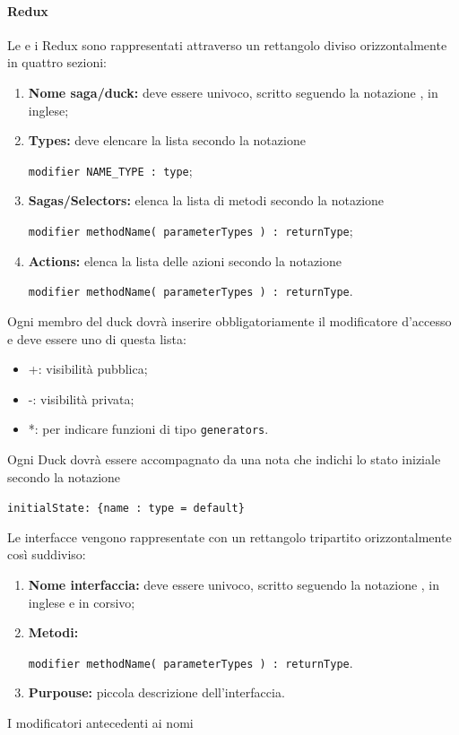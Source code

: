 \documentclass[NormeDiProgetto.tex]{subfiles}
\begin{document}
\paragraph{Redux}
Le  e i  Redux sono rappresentati attraverso un rettangolo diviso orizzontalmente in quattro sezioni:
\begin{enumerate}
	\item \textbf{Nome saga/duck:} deve essere univoco, scritto seguendo la notazione , in inglese;
	\item \textbf{Types:} deve elencare la lista secondo la notazione 
	\begin{center}
		\texttt{modifier NAME\_TYPE : type};
	\end{center}
	\item \textbf{Sagas/Selectors:} elenca la lista di metodi secondo la notazione 
	\begin{center}
		\texttt{modifier methodName( parameterTypes ) : returnType};
	\end{center}
	\item \textbf{Actions:} elenca la lista delle azioni secondo la notazione 
	\begin{center}
		\texttt{modifier methodName( parameterTypes ) : returnType}.
	\end{center}
\end{enumerate}
Ogni membro del duck dovrà inserire obbligatoriamente il modificatore d'accesso e deve essere uno di questa lista:
\begin{itemize}
	\item +: visibilità pubblica;
	\item -: visibilità privata;
	\item *: per indicare funzioni di tipo \texttt{generators}.
\end{itemize}
Ogni Duck dovrà essere accompagnato da una nota che indichi lo stato iniziale secondo la notazione
\begin{center}
	\texttt{initialState: \{name : type = default\}}
\end{center}
Le interfacce vengono rappresentate con un rettangolo tripartito orizzontalmente così suddiviso:
\begin{enumerate}
	\item \textbf{Nome interfaccia:} deve essere univoco, scritto seguendo la notazione , in inglese e in corsivo;
	\item \textbf{Metodi:} 	
	\begin{center}
		\texttt{modifier methodName( parameterTypes ) : returnType}.
	\end{center}
	\item \textbf{Purpouse:} piccola descrizione dell'interfaccia.
\end{enumerate}
I modificatori antecedenti ai nomi 
\end{document}
